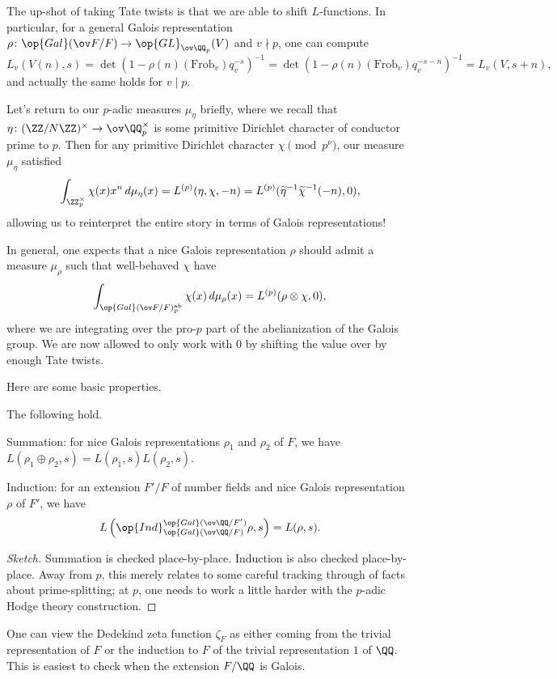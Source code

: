 \documentclass{article}
\begin{document}
The up-shot of taking Tate twists is that we are able to shift $L$-functions. In particular, for a general Galois representation $\rho\colon\op{Gal}(\ov F/F)\to\op{GL}_{\ov\QQ_p}(V)$ and $v\nmid p$, one can compute
\[L_v(V(n),s)=\det\left(1-\rho(n)(\mathrm{Frob}_v)q_v^{-s}\right)^{-1}=\det\left(1-\rho(n)(\mathrm{Frob}_v)q_v^{-s-n}\right)^{-1}=L_v(V,s+n),\]
and actually the same holds for $v\mid p$.
\begin{example}
	Let's return to our $p$-adic measures $\mu_\eta$ briefly, where we recall that $\eta\colon(\ZZ/N\ZZ)^\times\to\ov\QQ_p^\times$ is some primitive Dirichlet character of conductor prime to $p$. Then for any primitive Dirichlet character $\chi\pmod{p^\nu}$, our measure $\mu_\eta$ satisfied
	\[\int_{\ZZ_p^\times}\chi(x)x^n\,d\mu_\eta(x)=L^{(p)}(\eta,\chi,-n)=L^{(p)}(\widetilde\eta^{-1}\widetilde\chi^{-1}(-n),0),\]
	allowing us to reinterpret the entire story in terms of Galois representations! 
\end{example}
\begin{remark}
	In general, one expects that a nice Galois representation $\rho$ should admit a measure $\mu_\rho$ such that well-behaved $\chi$ have
	\[\int_{\op{Gal}(\ov F/F)^{\mathrm{ab}}_p}\chi(x)\,d\mu_\rho(x)=L^{(p)}(\rho\otimes\chi,0),\]
	where we are integrating over the pro-$p$ part of the abelianization of the Galois group. We are now allowed to only work with $0$ by shifting the value over by enough Tate twists.
\end{remark}
Here are some basic properties.
\begin{proposition}
	The following hold.
	\begin{listalph}
		\item Summation: for nice Galois representations $\rho_1$ and $\rho_2$ of $F$, we have $L(\rho_1\oplus\rho_2,s)=L(\rho_1,s)L(\rho_2,s)$.
		\item Induction: for an extension $F'/F$ of number fields and nice Galois representation $\rho$ of $F'$, we have
		\[L\left(\op{Ind}_{\op{Gal}(\ov\QQ/F)}^{\op{Gal}(\ov\QQ/F')}\rho,s\right)=L(\rho,s).\]
	\end{listalph}
\end{proposition}
\begin{proof}[Sketch]
	Summation is checked place-by-place.  Induction is also checked place-by-place. Away from $p$, this merely relates to some careful tracking through of facts about prime-splitting; at $p$, one needs to work a little harder with the $p$-adic Hodge theory construction.
\end{proof}
\begin{example}
	One can view the Dedekind zeta function $\zeta_F$ as either coming from the trivial representation of $F$ or the induction to $F$ of the trivial representation $1$ of $\QQ$. This is easiest to check when the extension $F/\QQ$ is Galois.
\end{example}
\end{document}
